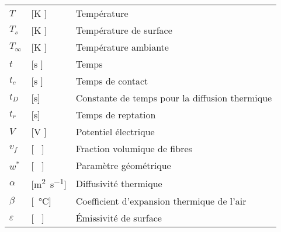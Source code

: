 \begin{longtable}{l p{2.5cm} p{4in}}
	$T$               & [\si{\kelvin} ]                                     & Température                                                                           \\
	$T_s$             & [\si{\kelvin} ]                                     & Température de surface                                                                \\
	$T_{\infty}$      & [\si{\kelvin} ]                                     & Température ambiante                                                                  \\
	$t$               & [\si{\second} ]                                     & Temps                                                                                 \\
	$t_c$             & [\si{\second} ]                                     & Temps de contact                                                                      \\
	$t_D$             & [\si{\second}]                                      & Constante de temps pour la diffusion thermique                                        \\
	$t_r$             & [\si{\second}]                                      & Temps de reptation                                                                    \\
	$V$               & [\si{\volt} ]                                       & Potentiel électrique                                                                  \\
	$v_f$             & [ \ ]                                               & Fraction volumique de fibres                                                          \\
	$w^*$             & [ \ ]                                               & Paramètre géométrique                                                                 \\
	$\alpha$          & [\si{\square\metre\per\second}]                     & Diffusivité thermique                                                                 \\
	$\beta$           & [\si{\per\celsius}]                                 & Coefficient d'expansion thermique de l'air                                            \\
	$\varepsilon$     & [ \ ]                                               & Émissivité de surface                                                                 \\

\end{longtable}
